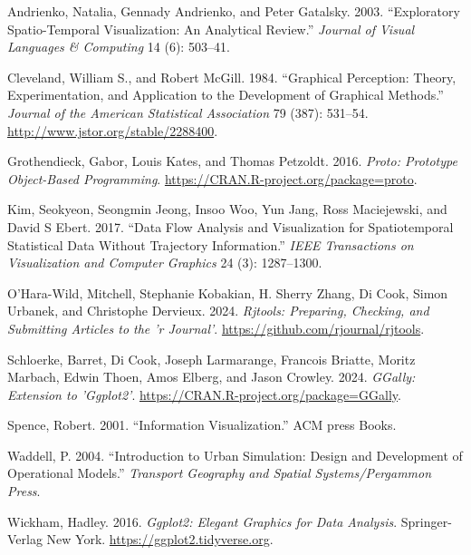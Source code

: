 \hypertarget{refs}{}
\begin{CSLReferences}{1}{0}
\leavevmode{}%
Andrienko, Natalia, Gennady Andrienko, and Peter Gatalsky. 2003. {``Exploratory Spatio-Temporal Visualization: An Analytical Review.''} \emph{Journal of Visual Languages \& Computing} 14 (6): 503--41.

\leavevmode{}%
Cleveland, William S., and Robert McGill. 1984. {``Graphical Perception: Theory, Experimentation, and Application to the Development of Graphical Methods.''} \emph{Journal of the American Statistical Association} 79 (387): 531--54. \url{http://www.jstor.org/stable/2288400}.

\leavevmode{}%
Grothendieck, Gabor, Louis Kates, and Thomas Petzoldt. 2016. \emph{Proto: Prototype Object-Based Programming}. \url{https://CRAN.R-project.org/package=proto}.

\leavevmode{}%
Kim, Seokyeon, Seongmin Jeong, Insoo Woo, Yun Jang, Ross Maciejewski, and David S Ebert. 2017. {``Data Flow Analysis and Visualization for Spatiotemporal Statistical Data Without Trajectory Information.''} \emph{IEEE Transactions on Visualization and Computer Graphics} 24 (3): 1287--1300.

\leavevmode{}%
O'Hara-Wild, Mitchell, Stephanie Kobakian, H. Sherry Zhang, Di Cook, Simon Urbanek, and Christophe Dervieux. 2024. \emph{Rjtools: Preparing, Checking, and Submitting Articles to the 'r Journal'}. \url{https://github.com/rjournal/rjtools}.

\leavevmode{}%
Schloerke, Barret, Di Cook, Joseph Larmarange, Francois Briatte, Moritz Marbach, Edwin Thoen, Amos Elberg, and Jason Crowley. 2024. \emph{GGally: Extension to 'Ggplot2'}. \url{https://CRAN.R-project.org/package=GGally}.

\leavevmode{}%
Spence, Robert. 2001. {``Information Visualization.''} ACM press Books.

\leavevmode{}%
Waddell, P. 2004. {``Introduction to Urban Simulation: Design and Development of Operational Models.''} \emph{Transport Geography and Spatial Systems/Pergammon Press}.

\leavevmode{}%
Wickham, Hadley. 2016. \emph{Ggplot2: Elegant Graphics for Data Analysis}. Springer-Verlag New York. \url{https://ggplot2.tidyverse.org}.


\end{CSLReferences}
